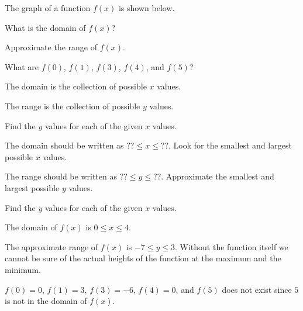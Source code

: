 \begin{activity}\label{A:0.1.1}
The graph of a function $f(x)$ is shown below. 
\begin{center}
\end{center}
\ba
\item What is the domain of $f(x)$?
\item Approximate the range of $f(x)$.
\item What are  $f(0)$, $f(1)$, $f(3)$, $f(4)$, and $f(5)$?
\ea

\end{activity}
\begin{smallhint}
    \ba
        \item The domain is the collection of possible $x$ values.
        \item The range is the collection of possible $y$ values.
        \item Find the $y$ values for each of the given $x$ values.
    \ea
\end{smallhint}
\begin{bighint}
    \ba
        \item The domain should be written as $?? \le x \le ??$.  Look for the smallest
            and largest possible $x$ values.
        \item The range should be written as $?? \le y \le ??$.  Approximate the smallest
            and largest possible $y$ values.
        \item Find the $y$ values for each of the given $x$ values.
    \ea
\end{bighint}
\begin{activitySolution}
   \ba
        \item The domain of $f(x)$ is $0 \le x \le 4$.
        \item The approximate range of $f(x)$ is $-7 \le y \le 3$.  Without the function
            itself we cannot be sure of the actual heights of the function at the maximum
            and the minimum.
        \item $f(0) = 0$, $f(1) = 3$, $f(3) = -6$, $f(4) = 0$, and $f(5)$ does not exist
            since $5$ is not in the domain of $f(x)$.
   \ea
\end{activitySolution}
\aftera
